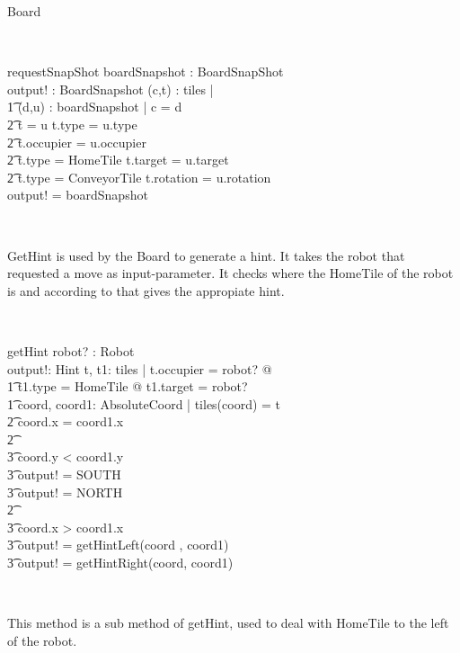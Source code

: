 \documentclass[12pt]{article}
\begin{document}
\begin{class}{Board}
\begin{classcom}
\end{classcom} \\
\begin{schema}{requestSnapShot}
boardSnapshot : BoardSnapShot \\
output! : BoardSnapshot
\where
\forall (c,t) : tiles |  \\ \t1
\exists (d,u) : boardSnapshot | c = d \: \wedge \\ \t2 t \not = u \wedge t.type = u.type \: \wedge \\ \t2 t.occupier = u.occupier \: \wedge \\ \t2 t.type = HomeTile \Rightarrow t.target = u.target \: \wedge \\ \t2 t.type = ConveyorTile \Rightarrow t.rotation = u.rotation \\
output! = boardSnapshot
\end{schema} \\
\begin{classcom}
GetHint is used by the Board to generate a hint. It takes the robot that requested a move as input-parameter. It checks where the HomeTile of the robot is and according to that gives the appropiate hint.
\end{classcom} \\
\begin{schema}{getHint}
robot? : Robot \\
output!: Hint
\where
\exists t, t1: \ran tiles | t.occupier = robot? @\\ \t1
t1.type = HomeTile @ t1.target = robot? \\ \t1
\exists coord, coord1: AbsoluteCoord | tiles(coord) = t \\ \t2
\IF coord.x = coord1.x \\ \t2
\THEN \\ \t3
\IF coord.y < coord1.y \\ \t3
\THEN output! = SOUTH \\ \t3
\ELSE output! = NORTH \\ \t2
\ELSE \\ \t3
\IF coord.x > coord1.x \\ \t3
\THEN output! = getHintLeft(coord , coord1) \\ \t3
\ELSE output! = getHintRight(coord, coord1)
\end{schema} \\
\znewpage
\begin{classcom}
This method is a sub method of getHint, used to deal with HomeTile to the left of the robot.
\end{classcom} \\

\end{class}
\end{document}
